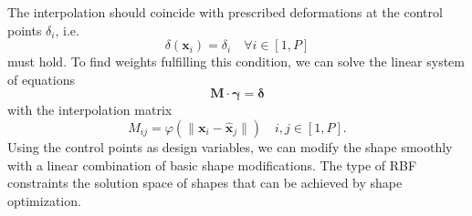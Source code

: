 The interpolation should coincide with prescribed deformations at the control points $\delta_i$, i.e. 
\begin{equation}
    \delta(\mathbf{x}_i) = \delta_i \quad \forall i \in [1, P]
\end{equation}
must hold. To find weights fulfilling this condition, we can solve the linear system of equations 
\begin{equation}
    \mathbf{M} \cdot \pmb{\gamma} = \pmb{\delta} 
\end{equation}
with the interpolation matrix 
\begin{equation}
    M_{ij} = \varphi(\lVert \mathbf{x}_i-\hat{\mathbf{x}}_j \rVert) \quad i,j \in [1, P]. 
\end{equation}
Using the control points as design variables, we can modify the shape smoothly with a linear combination of basic shape modifications. The type of RBF constraints the solution space of shapes that can be achieved by shape optimization. 

